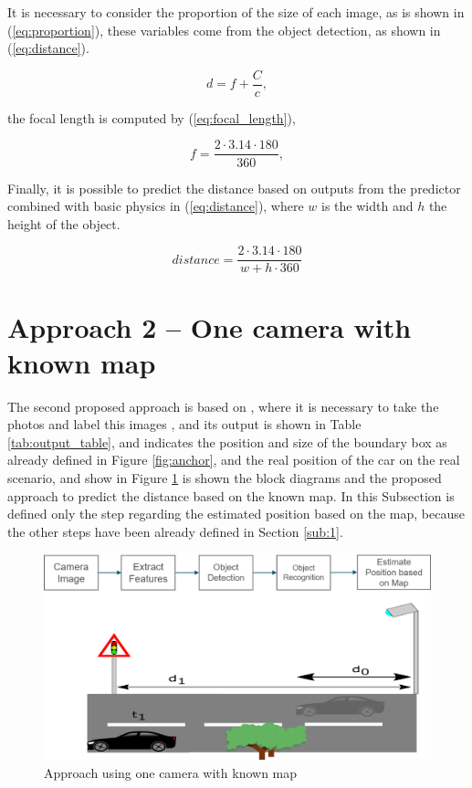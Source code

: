 It is necessary to consider the proportion of the size of each image, as is shown in (\ref{eq:proportion}), these variables come from the object detection, as shown in (\ref{eq:distance}).


\begin{equation}
    \label{eq:proportion}
    d = f + \frac{C}{c},
\end{equation}

the focal length is computed by (\ref{eq:focal_length}), 

\begin{equation}
    \label{eq:focal_length}
    f = \frac{2\cdot 3.14 \cdot 180}{360},
\end{equation}

Finally, it is possible to predict the distance based on outputs from the predictor combined with basic physics in (\ref{eq:distance}), where $w$ is the width and $h$ the height of the object.

\begin{equation}
    \label{eq:distance}
    distance = \frac{2 \cdot 3.14 \cdot  180}{w + h \cdot  360}
\end{equation}



 
\section{Approach 2 – One camera with known map}\label{sub:2}

The second proposed approach is based on  \cite{mayer2016large}, where it is necessary to take the photos and label this images \cite{tzutalin6labelimg}, and its output is shown in Table \ref{tab:output_table}, and indicates the position and size of the boundary box as already defined in Figure \ref{fig:anchor}, and the real position of the car on the real scenario, and show in Figure \ref{fig:proposal2} is shown the block diagrams and the proposed approach to predict the distance based on the known map. In this Subsection is defined only the step regarding the estimated position based on the map, because the other steps have been already defined in Section \ref{sub:1}. 


\begin{figure}[H]
\centering
\includegraphics[width=\textwidth]{imagens/proposal2.png}
\caption{Approach using one camera with known map}
\label{fig:proposal2}
\end{figure}


